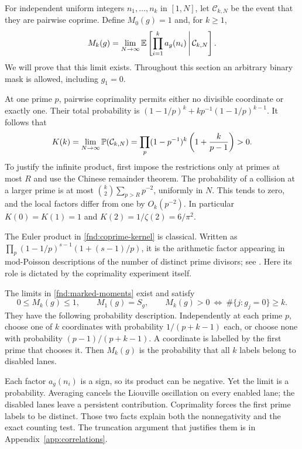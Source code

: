 For independent uniform integers $n_1,\ldots,n_k$ in $[1,N]$, let
$\mathcal C_{k,N}$ be the event that they are pairwise coprime.
Define $M_0(g)=1$ and, for $k\ge1$,
\begin{equation}
 M_k(g)=\lim_{N\to\infty}
 \mathbb E\left[\prod_{i=1}^k a_g(n_i)\,\middle|\,\mathcal C_{k,N}\right].
 \label{fnd:marked-moments}
\end{equation}
We will prove that this limit exists.  Throughout this section an
arbitrary binary mask is allowed, including $g_1=0$.

At one prime $p$, pairwise coprimality permits either no divisible
coordinate or exactly one.  Their total probability is
$(1-1/p)^k+k p^{-1}(1-1/p)^{k-1}$.  It follows that
\begin{equation}
 K(k)=\lim_{N\to\infty}\mathbb P(\mathcal C_{k,N})
 =\prod_p(1-p^{-1})^k\left(1+\frac{k}{p-1}\right)>0.
 \label{fnd:coprime-kernel}
\end{equation}
To justify the infinite product, first impose the restrictions only at
primes at most $R$ and use the Chinese remainder theorem.  The probability
of a collision at a larger prime is at most
$\binom{k}{2}\sum_{p>R}p^{-2}$, uniformly in $N$.
This tends to zero, and the local factors differ from one by
$O_k(p^{-2})$.  In particular $K(0)=K(1)=1$ and
$K(2)=1/\zeta(2)=6/\pi^2$.

The Euler product in \eqref{fnd:coprime-kernel} is classical.  Written
as
$\prod_p(1-1/p)^{s-1}(1+(s-1)/p)$, it is the arithmetic factor
appearing in mod-Poisson descriptions of the number of distinct prime
divisors; see \cite[Section 4]{fndKowalskiNikeghbali2009}.
Here its role is dictated by the coprimality experiment itself.

\begin{proposition}
\label{fnd:moment-positivity}
The limits in \eqref{fnd:marked-moments} exist and satisfy
\begin{equation}
 0\le M_k(g)\le1,\qquad M_1(g)=S_g,\qquad
 M_k(g)>0\ \Longleftrightarrow\ \#\{j:g_j=0\}\ge k.
 \label{fnd:moment-tests}
\end{equation}
They have the following probability description.  Independently at
each prime $p$, choose one of $k$ coordinates with probability
$1/(p+k-1)$ each, or choose none with probability
$(p-1)/(p+k-1)$.  A coordinate is labelled by the first prime that
chooses it.  Then $M_k(g)$ is the probability that all $k$ labels
belong to disabled lanes.
\end{proposition}
Each factor $a_g(n_i)$ is a sign, so its product can be negative.
Yet the limit is a probability. Averaging cancels the Liouville oscillation
on every enabled lane; the disabled lanes leave a persistent contribution.
Coprimality forces the first prime labels to be distinct. Those two facts
explain both the nonnegativity and the exact counting test. The truncation
argument that justifies them is in Appendix~\ref{app:correlations}.


